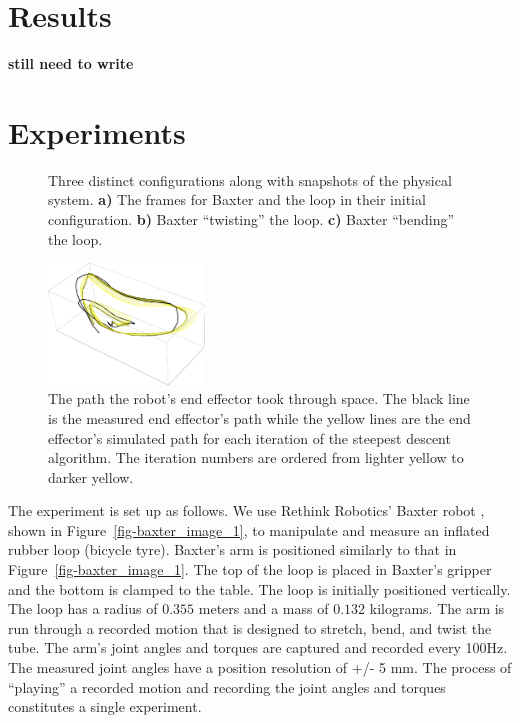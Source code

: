 \documentclass[runningheads,a4paper]{llncs}
\begin{document}



\section{Results}
\textbf{still need to write}


\section{Experiments}
\begin{figure}
\centering
\def\svgwidth{.9\textwidth}

\caption{Three distinct configurations along with snapshots of the physical system.  \textbf{a)} The frames for Baxter and the loop in their initial configuration. \textbf{b)} Baxter ``twisting'' the loop. \textbf{c)} Baxter ``bending'' the loop.}
\label{fig-3bloops}
\end{figure}
\begin{figure}
\centering
\includegraphics[width = 0.37\textwidth]{paths12.pdf}
\caption{The path the robot's end effector took through space.  The black line is the measured end effector's path while the yellow lines are the end effector's simulated path for each iteration of the steepest descent algorithm.  The iteration numbers are ordered from lighter yellow to darker yellow.  }
\label{fig-paths}
\end{figure}
The experiment is set up as follows.  We use Rethink Robotics' Baxter robot \cite{guizzo2011rethink}, shown in Figure~\ref{fig-baxter_image_1}, to manipulate and measure an inflated rubber loop (bicycle tyre). Baxter's arm is positioned similarly to that in Figure~\ref{fig-baxter_image_1}.  The top of the loop is placed in Baxter's gripper and the bottom is clamped to the table.   The loop is initially positioned vertically. The loop has a radius of $0.355$ meters and a mass of $0.132$ kilograms.  The arm is run through a recorded motion that is designed to stretch, bend, and twist the tube. The arm's joint angles and torques are captured and recorded every 100Hz.  The measured joint angles have a position resolution of +/- 5 mm.  The process of ``playing'' a recorded motion and recording the joint angles and torques constitutes a single experiment.
\end{document}
